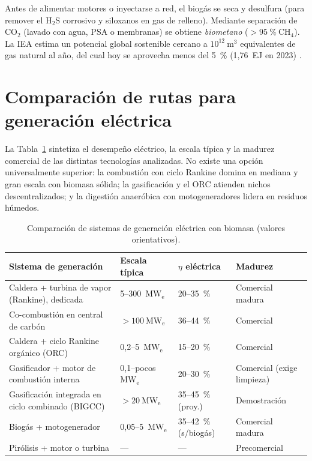 Antes de alimentar motores o inyectarse a red, el biogás se seca y desulfura (para remover el $\mathrm{H_2S}$ corrosivo y siloxanos en gas de relleno). Mediante separación de $\mathrm{CO_2}$ (lavado con agua, PSA o membranas) se obtiene \textit{biometano} ($>95~\%~\mathrm{CH_4}$). La IEA estima un potencial global sostenible cercano a $10^{12}~\text{m}^3$ equivalentes de gas natural al año, del cual hoy se aprovecha menos del 5~\% (1,76~EJ en 2023) \cite{iea2025biogas, wba2025gbsr}.

\section{Comparación de rutas para generación eléctrica}
\label{sec:comparacion_rutas}

La Tabla~\ref{tab:comparacion_rutas} sintetiza el desempeño eléctrico, la escala típica y la madurez comercial de las distintas tecnologías analizadas. No existe una opción universalmente superior: la combustión con ciclo Rankine domina en mediana y gran escala con biomasa sólida; la gasificación y el ORC atienden nichos descentralizados; y la digestión anaeróbica con motogeneradores lidera en residuos húmedos.

\begin{table}[H]
\centering
\caption{Comparación de sistemas de generación eléctrica con biomasa (valores orientativos).}
\label{tab:comparacion_rutas}
\begin{tabularx}{\textwidth}{@{}X l l l@{}}
\toprule
\textbf{Sistema de generación} & \textbf{Escala típica} & \textbf{$\eta$ eléctrica} & \textbf{Madurez} \\
\midrule
Caldera + turbina de vapor (Rankine), dedicada & 5--300~$\mathrm{MW_e}$ & 20--35~\% & Comercial madura \\
Co-combustión en central de carbón & $>100~\mathrm{MW_e}$ & 36--44~\% \cite{irena2013cofiring} & Comercial \\
Caldera + ciclo Rankine orgánico (ORC) & 0,2--5~$\mathrm{MW_e}$ & 15--20~\% & Comercial \\
Gasificador + motor de combustión interna & 0,1--pocos $\mathrm{MW_e}$ & 20--30~\% & Comercial (exige limpieza) \\
Gasificación integrada en ciclo combinado (BIGCC) & $>20~\mathrm{MW_e}$ & 35--45~\% (proy.) & Demostración \\
Biogás + motogenerador & 0,05--5~$\mathrm{MW_e}$ & 35--42~\% (s/biogás) & Comercial madura \\
Pirólisis + motor o turbina & --- & --- & Precomercial \\
\bottomrule
\end{tabularx}
\end{table}

